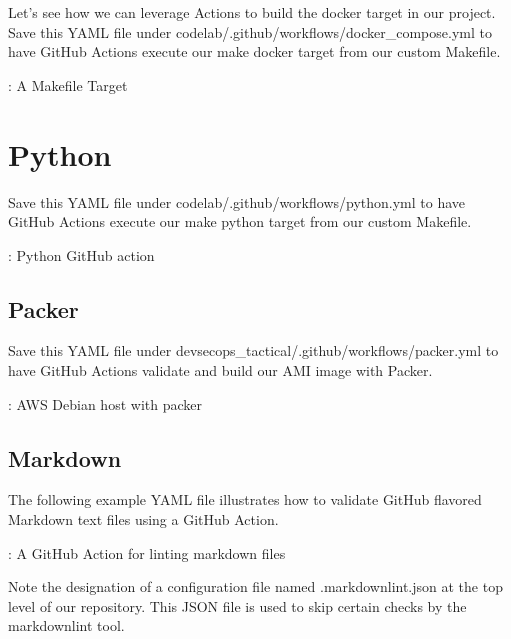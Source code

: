 Let's see how we can leverage Actions to build the docker target in our
project. Save this YAML file under
codelab/.github/workflows/docker\_compose.yml to have GitHub Actions
execute our make docker target from our custom Makefile.

\begin{mybox}{\thetcbcounter: A Makefile Target}
	
\end{mybox}


\section{Python}

Save this YAML file under codelab/.github/workflows/python.yml to have
GitHub Actions execute our make python target from our custom Makefile.

\begin{mybox}{\thetcbcounter: Python GitHub action}
	
\end{mybox}

\subsection{Packer}

Save this YAML file under devsecops\_tactical/.github/workflows/packer.yml to have
GitHub Actions validate and build our AMI image with Packer.

\begin{mybox}{\thetcbcounter: AWS Debian host with packer}
	
\end{mybox}

\subsection{Markdown}

The following example YAML file illustrates how to validate GitHub
flavored Markdown text files using a GitHub Action.

\begin{mybox}{\thetcbcounter: A GitHub Action for linting markdown files}
	
\end{mybox}

\justify
Note the designation of a configuration file named .markdownlint.json at
the top level of our repository. This JSON file is used to skip certain
checks by the markdownlint tool.

